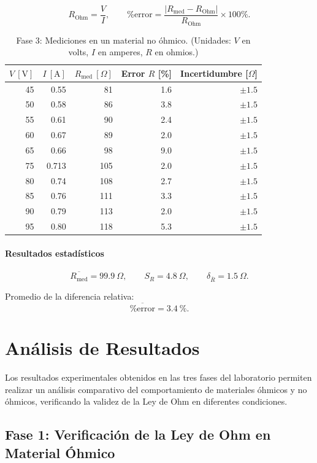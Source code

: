 \documentclass[11pt,twocolumn]{article}
\begin{document}
\[
R_{\mathrm{Ohm}} = \frac{V}{I}, 
\qquad 
\%\mathrm{error} = \frac{|R_{\mathrm{med}} - R_{\mathrm{Ohm}}|}{R_{\mathrm{Ohm}}}\times 100\%.
\]

\begin{table}[h]
\centering
\caption{Fase 3: Mediciones en un material no óhmico. 
(Unidades: $V$ en volts, $I$ en amperes, $R$ en ohmios.)}
\label{tab:fase3}
\begin{tabular}{r r r r r}
\hline
$V\ [\mathrm{V}]$ & $I\ [\mathrm{A}]$ & $R_{\mathrm{med}}\ [\Omega]$ & Error $R$ [\%] & Incertidumbre [\(\Omega\)] \\
\hline
45  & 0.55  & 81  & 1.6   & $\pm 1.5$ \\
50  & 0.58  & 86  & 3.8   & $\pm 1.5$ \\
55  & 0.61  & 90  & 2.4   & $\pm 1.5$ \\
60  & 0.67  & 89  & 2.0   & $\pm 1.5$ \\
65  & 0.66  & 98  & 9.0   & $\pm 1.5$ \\
75  & 0.713 & 105 & 2.0   & $\pm 1.5$ \\
80  & 0.74  & 108 & 2.7   & $\pm 1.5$ \\
85  & 0.76  & 111 & 3.3   & $\pm 1.5$ \\
90  & 0.79  & 113 & 2.0   & $\pm 1.5$ \\
95  & 0.80  & 118 & 5.3   & $\pm 1.5$ \\
\hline
\end{tabular}
\end{table}

\paragraph{Resultados estadísticos}
\[
\overline{R_{\mathrm{med}}} = 99.9\ \Omega,
\qquad
S_{R} = 4.8\ \Omega,
\qquad
\delta_{\overline{R}} = 1.5\ \Omega.
\]

Promedio de la diferencia relativa:
\[
\overline{\%\mathrm{error}} = 3.4\ \%.
\]

\section{Análisis de Resultados}

Los resultados experimentales obtenidos en las tres fases del laboratorio permiten realizar un análisis comparativo del comportamiento de materiales óhmicos y no óhmicos, verificando la validez de la Ley de Ohm en diferentes condiciones.

\subsection*{Fase 1: Verificación de la Ley de Ohm en Material Óhmico}
\end{document}
